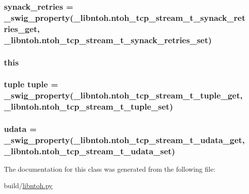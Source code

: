 \hypertarget{classlibntoh_1_1ntoh__tcp__stream__t_a1a6b192c6b711327b1c200ab48945023}{
\subsubsection[{synack\-\_\-retries}]{ synack\-\_\-retries = {\bf \-\_\-swig\-\_\-property}(\-\_\-libntoh.\-ntoh\-\_\-tcp\-\_\-stream\-\_\-t\-\_\-synack\-\_\-retries\-\_\-get, \-\_\-libntoh.\-ntoh\-\_\-tcp\-\_\-stream\-\_\-t\-\_\-synack\-\_\-retries\-\_\-set)\hspace{0.3cm}{\ttfamily [static]}}}\label{classlibntoh_1_1ntoh__tcp__stream__t_a1a6b192c6b711327b1c200ab48945023}
\hypertarget{classlibntoh_1_1ntoh__tcp__stream__t_a05c09a5e9d53fa7adf0a7936038c2fa3}{
\subsubsection[{this}]{\setlength{\rightskip}{0pt plus 5cm}this}}\label{classlibntoh_1_1ntoh__tcp__stream__t_a05c09a5e9d53fa7adf0a7936038c2fa3}
\hypertarget{classlibntoh_1_1ntoh__tcp__stream__t_a945ee80121c935cc2e86d758ecc70579}{
\subsubsection[{tuple}]{\setlength{\rightskip}{0pt plus 5cm}tuple tuple = {\bf \-\_\-swig\-\_\-property}(\-\_\-libntoh.\-ntoh\-\_\-tcp\-\_\-stream\-\_\-t\-\_\-tuple\-\_\-get, \-\_\-libntoh.\-ntoh\-\_\-tcp\-\_\-stream\-\_\-t\-\_\-tuple\-\_\-set)\hspace{0.3cm}{\ttfamily [static]}}}\label{classlibntoh_1_1ntoh__tcp__stream__t_a945ee80121c935cc2e86d758ecc70579}
\hypertarget{classlibntoh_1_1ntoh__tcp__stream__t_a6900744e840ca75a67e020c38d143891}{
\subsubsection[{udata}]{ udata = {\bf \-\_\-swig\-\_\-property}(\-\_\-libntoh.\-ntoh\-\_\-tcp\-\_\-stream\-\_\-t\-\_\-udata\-\_\-get, \-\_\-libntoh.\-ntoh\-\_\-tcp\-\_\-stream\-\_\-t\-\_\-udata\-\_\-set)\hspace{0.3cm}{\ttfamily [static]}}}\label{classlibntoh_1_1ntoh__tcp__stream__t_a6900744e840ca75a67e020c38d143891}


The documentation for this class was generated from the following file\-:\begin{DoxyCompactItemize}
\item 
build/\hyperlink{libntoh_8py}{libntoh.\-py}\end{DoxyCompactItemize}
